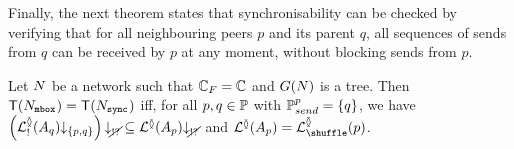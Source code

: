 \documentclass[submission,copyright,creativecommons,UKenglish]{eptcs}
\begin{document}
Finally, the next theorem states that synchronisability can be checked by verifying that for all neighbouring peers $p$ and its parent $q$, all sequences of sends from $q$ can be received by $p$ at any moment, \ie without blocking sends from $p$. 

\begin{theorem}
	Let $ N $ be a network such that $\mathbb{C}_F = \mathbb{C}$ and $ G(N) $ is a tree.
	Then $ \mathsf{T}(N_{{\mathtt{mbox}}^{}}) = \mathsf{T}(N_{{\mathtt{sync}}^{}}) $ iff, for all $ p, q \in \mathbb{P} $ with $ \mathbb{P}_{send}^{p} = {\left\lbrace q \right\rbrace} $, we have $ \left( \mathcal{L}_{!}^{\between}{\left( A_{q} \right)}{\downarrow_{{\left\lbrace p, q \right\rbrace}}} \right){\downarrow_{\cancel{!?}}} \subseteq \mathcal{L}^{\between}{\left( A_{p} \right)}{\downarrow_{\cancel{!?}}} $ and $ \LangTree{\Automaton{p}} = \LangShuffle{p} $.
	\label{thm:synchronisabilityTree}
\end{theorem}
\end{document}
